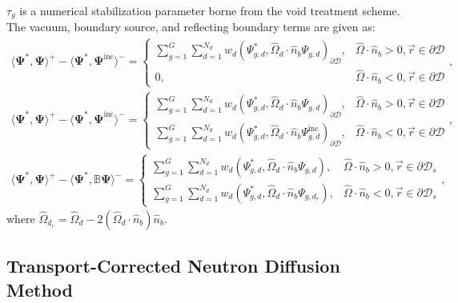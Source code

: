\documentclass[letterpaper]{mc2025}
\begin{document}
$\tau_g$ is a numerical stabilization parameter borne from the void treatment scheme.
The vacuum, boundary source, and reflecting boundary terms are given as:
%
\begin{gather}
  \langle\bm{\Psi}^*,\bm{\Psi}\rangle^+ - \langle\bm{\Psi}^*,\bm{\Psi}^\text{inc}\rangle^- =
  \begin{cases}
    \sum^G_{g=1}\sum^{N_d}_{d=1}w_d\left(\Psi^*_{g,d},
    \hat{\Omega}_d\cdot\hat{n}_b\Psi_{g,d}\right)_{\partial\mathcal{D}},
    & \hat{\Omega}\cdot\hat{n}_b>0,\vec{r}\in\partial\mathcal{D} \\
    0,
    & \hat{\Omega}\cdot\hat{n}_b<0,\vec{r}\in\partial\mathcal{D}
  \end{cases}, \\
  \langle\bm{\Psi}^*,\bm{\Psi}\rangle^+ - \langle\bm{\Psi}^*,\bm{\Psi}^\text{inc}\rangle^- =
  \begin{cases}
    \sum^G_{g=1}\sum^{N_d}_{d=1}w_d\left(\Psi^*_{g,d},
    \hat{\Omega}_d\cdot\hat{n}_b\Psi_{g,d}\right)_{\partial\mathcal{D}},
    & \hat{\Omega}\cdot\hat{n}_b>0,\vec{r}\in\partial\mathcal{D} \\
    \sum^G_{g=1}\sum^{N_d}_{d=1}w_d\left(\Psi^*_{g,d},
    \hat{\Omega}_d\cdot\hat{n}_b\Psi^\text{inc}_{g,d}\right)_{\partial\mathcal{D}},
    & \hat{\Omega}\cdot\hat{n}_b<0,\vec{r}\in\partial\mathcal{D}
  \end{cases}, \label{eq:boundary-source} \\
  \langle\bm{\Psi}^*,\bm{\Psi}\rangle^+ - \langle\bm{\Psi}^*,\mathbb{B}\bm{\Psi}\rangle^- =
  \begin{cases}
    \sum^G_{g=1}\sum^{N_d}_{d=1}w_d\left(\Psi^*_{g,d},
    \hat{\Omega}_d\cdot\hat{n}_b\Psi_{g,d}\right),
    & \hat{\Omega}\cdot\hat{n}_b>0,\vec{r}\in\partial\mathcal{D}_s \\
    \sum^G_{g=1}\sum^{N_d}_{d=1}w_d\left(\Psi^*_{g,d},
    \hat{\Omega}_d\cdot\hat{n}_b\Psi_{g,d_r}\right),
    & \hat{\Omega}\cdot\hat{n}_b<0,\vec{r}\in\partial\mathcal{D}_s
  \end{cases}, \label{eq:reflecting-bc}
\end{gather}
%
where $\hat{\Omega}_{d_r} = \hat{\Omega}_d - 2(\hat{\Omega}_d\cdot\hat{n}_b)\hat{n}_b$.

\subsection{Transport-Corrected Neutron Diffusion Method} \label{sec:transport-correction}

\end{document}

